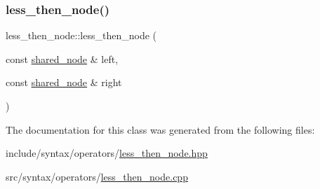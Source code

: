 \subsubsection{\texorpdfstring{less\+\_\+then\+\_\+node()}{less\_then\_node()}}
{\footnotesize\ttfamily less\+\_\+then\+\_\+node\+::less\+\_\+then\+\_\+node (\begin{DoxyParamCaption}\item[{const \hyperlink{namespacejawe_a3f307481d921b6cbb50cc8511fc2b544}{shared\+\_\+node} \&}]{left,  }\item[{const \hyperlink{namespacejawe_a3f307481d921b6cbb50cc8511fc2b544}{shared\+\_\+node} \&}]{right }\end{DoxyParamCaption})}



The documentation for this class was generated from the following files\+:\begin{DoxyCompactItemize}
\item 
include/syntax/operators/\hyperlink{less__then__node_8hpp}{less\+\_\+then\+\_\+node.\+hpp}\item 
src/syntax/operators/\hyperlink{less__then__node_8cpp}{less\+\_\+then\+\_\+node.\+cpp}\end{DoxyCompactItemize}

